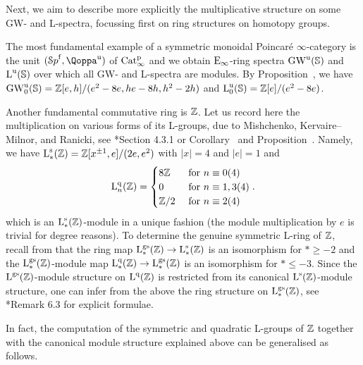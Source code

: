 Next, we aim to describe more explicitly the multiplicative structure on some GW- and L-spectra, focussing first on ring structures on homotopy groups.
\begin{example}
\label{example:universal}%
The most fundamental example of a symmetric monoidal Poincaré $\infty$-category is the unit $(\Spaf,\QF^{\uni})$ of $\mathrm{Cat}^{\mathrm p}_\infty$ and we obtain ${\mathrm{E}_{\infty}}$-ring spectra $\operatorname{GW}^{\mathrm{u}}(\mathbb{S})$ and $\operatorname L^{\mathrm{u}}(\mathbb{S})$ over which all GW- and L-spectra are modules. By Proposition~, we have
$\operatorname{GW}_0^{\mathrm{u}}(\mathbb{S}) = \mathbb{Z}[e,h]/(e^2-8e,he-8h,h^2-2h)$ and $\operatorname L_0^{\mathrm{u}}(\mathbb{S}) = \mathbb{Z}[e]/(e^2-8e)$.
\end{example}

\begin{example}
\label{example:L-ring-Z}%
Another fundamental commutative ring is $\mathbb{Z}$. Let us record here the multiplication on various forms of its L-groups, due to Mishchenko, Kervaire--Milnor, and Ranicki, see \cite{Ranickiyellowbook}*{Section 4.3.1} or Corollary~ and Proposition~. Namely, we have $\operatorname L^{\mathrm{s}}_*(\mathbb{Z}) = \mathbb{Z}[x^{\pm 1},e]/(2e,e^2)$ with $|x|=4$ and $|e|=1$ and 
\[
\operatorname L^{\mathrm{q}}_n(\mathbb{Z}) = \begin{cases} 8\mathbb{Z} & \text{ for } n\equiv 0 (4) \\ 0 & \text{ for } n \equiv 1,3 (4) \\ \mathbb{Z}/2 & \text{ for } n \equiv 2(4) \end{cases}.
\]
which is an $\operatorname L_*^{\mathrm{s}}(\mathbb{Z})$-module in a unique fashion (the module multiplication by $e$ is trivial for degree reasons). To determine the genuine symmetric L-ring of $\mathbb{Z}$, recall from \paperthree that the ring map $\operatorname L^{\mathrm{gs}}_*(\mathbb{Z}) \to \operatorname L^{\mathrm{s}}_*(\mathbb{Z})$ is an isomorphism for $*\geq -2$ and the $\operatorname L^{\mathrm{gs}}_*(\mathbb{Z})$-module map $\operatorname L^{\mathrm{q}}_*(\mathbb{Z}) \to \operatorname L^{\mathrm{gs}}_*(\mathbb{Z})$ is an isomorphism for $*\leq -3$. Since the $\operatorname L^{\mathrm{gs}}(\mathbb{Z})$-module structure on $\operatorname L^{\mathrm{q}}(\mathbb{Z})$ is restricted from its canonical $\operatorname L^{\mathrm{s}}(\mathbb{Z})$-module structure, one can infer from the above the ring structure on $\operatorname L^{\mathrm{gs}}_*(\mathbb{Z})$, see \cite{HLN}*{Remark 6.3} for explicit formulae.
\end{example}

In fact, the computation of the symmetric and quadratic L-groups of $\mathbb{Z}$ together with the canonical module structure explained above can be generalised as follows.

